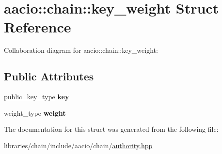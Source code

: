 \hypertarget{structaacio_1_1chain_1_1key__weight}{}\section{aacio\+:\+:chain\+:\+:key\+\_\+weight Struct Reference}
\label{structaacio_1_1chain_1_1key__weight}


Collaboration diagram for aacio\+:\+:chain\+:\+:key\+\_\+weight\+:
\subsection*{Public Attributes}
\begin{DoxyCompactItemize}
\item 
\mbox{\label{structaacio_1_1chain_1_1key__weight_a0ab826d44e2fa8139e1c9239ae16e52c}} 
\mbox{\hyperlink{classfc_1_1crypto_1_1public__key}{public\+\_\+key\+\_\+type}} {\bfseries key}
\item 
\mbox{\label{structaacio_1_1chain_1_1key__weight_a93394f6cedcaf5fd6d763f6df96177b5}} 
weight\+\_\+type {\bfseries weight}
\end{DoxyCompactItemize}


The documentation for this struct was generated from the following file\+:\begin{DoxyCompactItemize}
\item 
libraries/chain/include/aacio/chain/\mbox{\hyperlink{authority_8hpp}{authority.\+hpp}}\end{DoxyCompactItemize}
